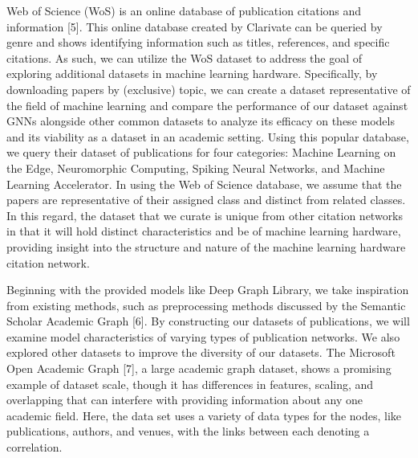 \documentclass[conference]{IEEEtran}
\begin{document}
Web of Science (WoS) is an online database of publication citations and information [5]. 
This online database created by Clarivate can be queried by genre and shows identifying information such as titles, 
references, and specific citations. As such, we can utilize the WoS dataset to address the goal of exploring additional 
datasets in machine learning hardware. Specifically, by downloading papers by (exclusive) topic, 
we can create a dataset representative of the field of machine learning and compare the performance of our dataset 
against GNNs alongside other common datasets to analyze its efficacy on these models and its viability as a dataset 
in an academic setting. Using this popular database, we query their dataset of publications for four categories: 
Machine Learning on the Edge, Neuromorphic Computing, Spiking Neural Networks, and Machine Learning Accelerator. 
In using the Web of Science database, we assume that the papers are representative of their assigned class and 
distinct from related classes. In this regard, the dataset that we curate is unique from other citation networks 
in that it will hold distinct characteristics and be of machine learning hardware, providing insight into the 
structure and nature of the machine learning hardware citation network. \par

Beginning with the provided models like Deep Graph Library, we take inspiration from existing methods, 
such as preprocessing methods discussed by the Semantic Scholar Academic Graph [6]. By constructing our 
datasets of publications, we will examine model characteristics of varying types of publication networks. 
We also explored other datasets to improve the diversity of our datasets. The  Microsoft Open Academic Graph [7], 
a large academic graph dataset, shows a promising example of dataset scale, though it has differences in 
features, scaling, and overlapping that can interfere with providing information about any one academic field. 
Here, the data set uses a variety of data types for the nodes, like publications, authors, and venues, with 
the links between each denoting a correlation. \par 
\end{document}
